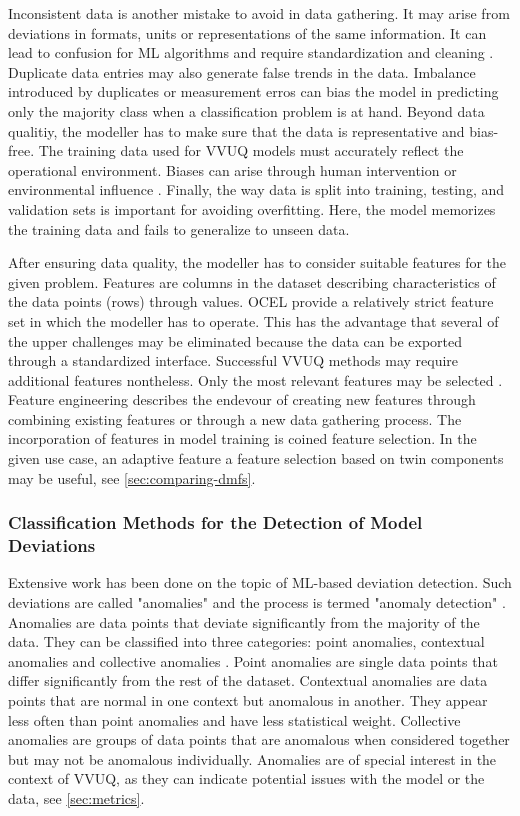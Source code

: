 Inconsistent data is another mistake to avoid in data gathering. It may arise from deviations in formats, units or representations of the same information. It can lead to confusion for ML algorithms and require standardization and cleaning \parencite{mahanthappa2021data}. Duplicate data entries may also generate false trends in the data. Imbalance introduced by duplicates or measurement erros can bias the model in predicting only the majority class when a classification problem is at hand.
Beyond data qualitiy, the modeller has to make sure that the data is representative and bias-free. The training data used for VVUQ models must accurately reflect the operational environment. Biases can arise through human intervention or environmental influence \parencite{liu2020noise}. Finally, the way data is split into training, testing, and validation sets is important for avoiding overfitting. Here, the model memorizes the training data and fails to generalize to unseen data.

After ensuring data quality, the modeller has to consider suitable features for the given problem. Features are columns in the dataset describing characteristics of the data points (rows) through values. OCEL provide a relatively strict feature set in which the modeller has to operate. This has the advantage that several of the upper challenges may be eliminated because the data can be exported through a standardized interface. Successful VVUQ methods may require additional features nontheless. Only the most relevant features may be selected \parencite{geron2022hands}. Feature engineering describes the endevour of creating new features through combining existing features or through a new data gathering process. The incorporation of features in model training is coined feature selection. In the given use case, an adaptive feature a feature selection based on twin components may be useful, see \autoref{sec:comparing-dmfs}.

\subsubsection*{Classification Methods for the Detection of Model Deviations}
\label{sec:classification-methods}
Extensive work has been done on the topic of ML-based deviation detection. Such deviations are called "anomalies" and the process is termed "anomaly detection" \parencite{kharitonov2022comparative}. Anomalies are data points that deviate significantly from the majority of the data. They can be classified into three categories: point anomalies, contextual anomalies and collective anomalies \parencite{chandola2009anomaly}. Point anomalies are single data points that differ significantly from the rest of the dataset. Contextual anomalies are data points that are normal in one context but anomalous in another. They appear less often than point anomalies and have less statistical weight. Collective anomalies are groups of data points that are anomalous when considered together but may not be anomalous individually. Anomalies are of special interest in the context of VVUQ, as they can indicate potential issues with the model or the data, see \autoref{sec:metrics}.

